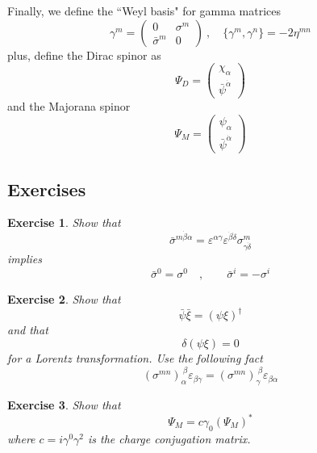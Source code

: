 \documentclass[a4paper,12pt]{article}
\newtheorem{exe}{Exercise}
\numberwithin{equation}{section}
\numberwithin{exe}{section}
\renewcommand{\dag}{{\dagger}}
\renewcommand{\a}{{\alpha}}
\newcommand{\ad}{{\dot\alpha}}
\renewcommand{\b}{{\beta}}
\newcommand{\bd}{{\dot\beta}}
\newcommand{\g}{{\gamma}}
\renewcommand{\d}{{\delta}}
\newcommand{\dd}{{\dot\delta}}
\newcommand{\ve}{{\varepsilon}}
\newcommand{\s}{{\sigma}}
\renewcommand{\sb}{{\bar\sigma}}
\newcommand{\psib}{{\bar\psi}}
\begin{document}
Finally, we define the ``Weyl basis" for gamma matrices
	\begin{equation}
	\g^m = \left(
		\begin{array}{cc}
		0 & \s^m \\
		\sb^m & 0
		\end{array}
	\right)\ ,\quad \{\g^m, \g^n\} = -2 \eta^{mn}
	\end{equation}
plus, define the Dirac spinor as
	\begin{equation}
	\Psi_D = \left(
		\begin{array}{c}
		\chi_\a \\
		\psib^\ad
		\end{array}
	\right)
	\end{equation}
and the Majorana spinor
	\begin{equation}
	\Psi_M = \left(
		\begin{array}{c}
		\psi_\a \\
		\psib^\ad
		\end{array}
	\right)
	\end{equation}

\subsection{Exercises}

	\begin{exe}
	Show that
		\begin{equation}
		\sb^{m\bd\a} = \ve^{\a\g} \ve^{\bd\dd} \s^m_{\g\dd}
		\end{equation}
	implies
		\begin{equation}
		\sb^0 = \s^0\quad,\qquad \sb^i = -\s^i
		\end{equation}
	\end{exe}

	\begin{exe}
	Show that
		\begin{equation}
		\bar\psi \bar\xi = (\psi\xi)^\dag
		\end{equation}
	and that
		\begin{equation}
		\d(\psi\xi) = 0
		\end{equation}
	for a Lorentz transformation. Use the following fact
		\begin{equation}
		(\s^{mn})_\a^{\ \b} \ve_{\b\g} = (\s^{mn})_\g^{\ \b} \ve_{\b\a}
		\end{equation}
	\end{exe}

	\begin{exe}
	Show that
		\begin{equation}
		\Psi_M = c \g_0 (\Psi_M)^*
		\end{equation}
	where $c = i\g^0\g^2$ is the charge conjugation matrix.
	\end{exe}
\end{document}
